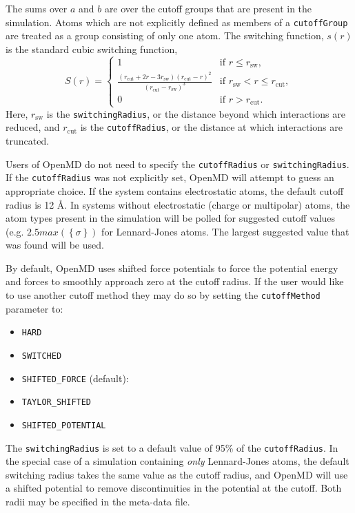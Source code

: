 \documentclass[letterpaper]{report}
\begin{document}
The sums over $a$ and $b$ are over the cutoff groups that are present
in the simulation.  Atoms which are not explicitly defined as members
of a {\tt cutoffGroup} are treated as a group consisting of only one
atom.  The switching function, $s(r)$ is the standard cubic switching
function,
\begin{equation}
S(r) = 
	\begin{cases}
	1 & \text{if $r \le r_{\text{sw}}$},\\
	\frac{(r_{\text{cut}} + 2r - 3r_{\text{sw}})(r_{\text{cut}} - r)^2}
	{(r_{\text{cut}} - r_{\text{sw}})^3} 
	& \text{if $r_{\text{sw}} < r \le r_{\text{cut}}$}, \\
	0 & \text{if $r > r_{\text{cut}}$.}
	\end{cases}
\label{eq:dipoleSwitching}
\end{equation}
Here, $r_{\text{sw}}$ is the {\tt switchingRadius}, or the distance
beyond which interactions are reduced, and $r_{\text{cut}}$ is the
{\tt cutoffRadius}, or the distance at which interactions are
truncated.  

Users of OpenMD do not need to specify the {\tt cutoffRadius} or
{\tt switchingRadius}.   
If the {\tt cutoffRadius} was not explicitly set, OpenMD will attempt
to guess an appropriate choice.  If the system contains electrostatic
atoms, the default cutoff radius is 12 \AA.  In systems without
electrostatic (charge or multipolar) atoms, the atom types present in the simulation will be
polled for suggested cutoff values (e.g. $2.5 max(\left\{ \sigma
  \right\})$ for Lennard-Jones atoms.   The largest suggested value
that was found will be used.

By default, OpenMD uses shifted force potentials to force the
potential energy and forces to smoothly approach zero at the cutoff
radius.  If the user would like to use another cutoff method
they may do so by setting the {\tt cutoffMethod} parameter to:
\begin{itemize}
\item {\tt HARD}
\item {\tt SWITCHED}
\item {\tt SHIFTED\_FORCE} (default):
\item {\tt TAYLOR\_SHIFTED}
\item {\tt SHIFTED\_POTENTIAL}
\end{itemize}

The {\tt switchingRadius} is set to a default value of 95\% of the
{\tt cutoffRadius}.  In the special case of a simulation containing
{\it only} Lennard-Jones atoms, the default switching radius takes the
same value as the cutoff radius, and OpenMD will use a shifted
potential to remove discontinuities in the potential at the cutoff.
Both radii may be specified in the meta-data file.
\end{document}
